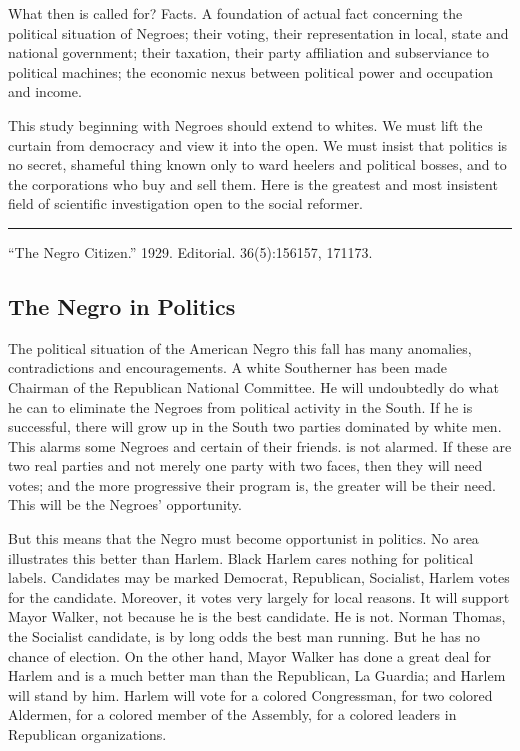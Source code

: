 \documentclass[letterpaper,10pt,english]{jupyterBook}
\begin{document}
\sphinxAtStartPar
What then is called for? Facts. A foundation of actual fact concerning the political situation of Negroes; their voting, their representation in local, state and national government; their taxation, their party affiliation and subserviance to political machines; the economic nexus between political power and occupation and income.

\sphinxAtStartPar
This study beginning with Negroes should extend to whites. We must lift the curtain from democracy and view it into the open. We must insist that politics is no secret, shameful thing known only to ward heelers and political bosses, and to the corporations who buy and sell them. Here is the greatest and most insistent field of scientific investigation open to the social reformer.


\bigskip\hrule\bigskip


\sphinxAtStartPar
{} “The Negro Citizen.” 1929. Editorial.  36(5):156\sphinxhyphen{}157, 171\sphinxhyphen{}173.


\subsection{The Negro in Politics}
\label{\detokenize{Volumes/36/11/negro_in_politics:the-negro-in-politics}}\label{\detokenize{Volumes/36/11/negro_in_politics::doc}}
\sphinxAtStartPar
The political situation of the American Negro this fall has many anomalies, contradictions and encouragements. A white Southerner has been made Chairman of the Republican National Committee. He will undoubtedly do what he can to eliminate the Negroes from political activity in the South. If he is successful, there will grow up in the South two parties dominated by white men. This alarms some Negroes and certain of their friends.  is not alarmed. If these are two real parties and not merely one party with two faces, then they will need votes; and the more progressive their program is, the greater will be their need. This will be the Negroes’ opportunity.

\sphinxAtStartPar
But this means that the Negro must become opportunist in politics. No area illustrates this better than Harlem. Black Harlem cares nothing for political labels. Candidates may be marked Democrat, Republican, Socialist, Harlem votes for the candidate. Moreover, it votes very largely for local reasons. It will support Mayor Walker, not because he is the best candidate. He is not. Norman Thomas, the Socialist candidate, is by long odds the best man running. But he has no chance of election. On the other hand, Mayor Walker has done a great deal for Harlem and is a much better man than the Republican, La Guardia; and Harlem will stand by him. Harlem will vote for a colored Congressman, for two colored Aldermen, for a colored member of the Assembly, for a colored leaders in Republican organizations.
\end{document}
